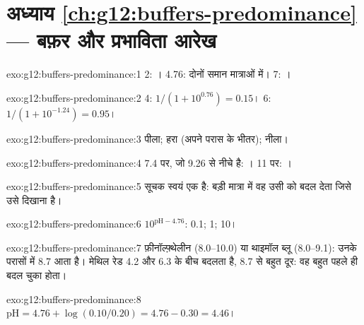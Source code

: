 \section*{अध्याय \ref{ch:g12:buffers-predominance} --- बफ़र और प्रभाविता आरेख}

\begin{solution}{exo:g12:buffers-predominance:1}
 2: ।  4.76: दोनों समान मात्राओं में।  7: ।
\end{solution}

\begin{solution}{exo:g12:buffers-predominance:2}
 4: $1/(1 + 10^{0.76}) = 0.15$।  6: $1/(1 + 10^{-1.24}) = 0.95$।
\end{solution}

\begin{solution}{exo:g12:buffers-predominance:3}
पीला; हरा (अपने परास के भीतर); नीला।
\end{solution}

\begin{solution}{exo:g12:buffers-predominance:4}
 7.4 पर, जो 9.26 से नीचे है: ।  11 पर: ।
\end{solution}

\begin{solution}{exo:g12:buffers-predominance:5}
सूचक स्वयं एक  है: बड़ी मात्रा में वह उसी  को
बदल देता जिसे उसे दिखाना है।
\end{solution}

\begin{solution}{exo:g12:buffers-predominance:6}
$10^{\mathrm{pH} - 4.76}$: 0.1; 1; 10।
\end{solution}

\begin{solution}{exo:g12:buffers-predominance:7}
फ़ीनॉल्फ़्थेलीन (8.0--10.0) या थाइमॉल ब्लू (8.0--9.1): उनके परासों में
8.7 आता है। मेथिल रेड 4.2 और 6.3 के बीच बदलता है, 8.7 से बहुत दूर: वह
बहुत पहले ही बदल चुका होता।
\end{solution}

\begin{solution}{exo:g12:buffers-predominance:8}
$\mathrm{pH} = 4.76 + \log(0.10/0.20) = 4.76 - 0.30 = 4.46$।
\end{solution}

